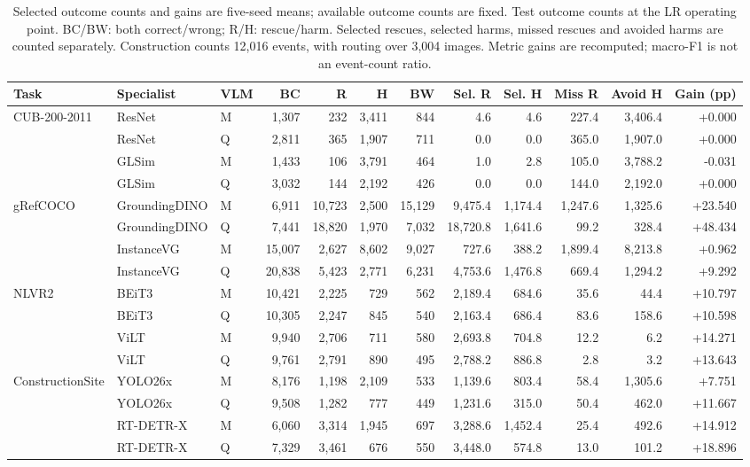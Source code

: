\begin{table}[H]
\centering
\caption{Selected outcome counts and gains are five-seed means; available outcome counts are fixed. Test outcome counts at the LR operating point. BC/BW: both correct/wrong; R/H: rescue/harm. Selected rescues, selected harms, missed rescues and avoided harms are counted separately. Construction counts 12,016 events, with routing over 3,004 images. Metric gains are recomputed; macro-F1 is not an event-count ratio.}
\label{tab:outcomes_full}
\fontsize{8.5}{10.2}\selectfont
\setlength{\tabcolsep}{3pt}
\renewcommand{\arraystretch}{1.12}
\begin{tabular}{@{}lllrrrrrrrrr@{}}
\toprule
Task & Specialist & VLM & BC & R & H & BW & Sel. R & Sel. H & Miss R & Avoid H & Gain (pp) \\
\midrule
CUB-200-2011 & ResNet & M & 1,307 & 232 & 3,411 & 844 & 4.6 & 4.6 & 227.4 & 3,406.4 & +0.000 \\
 & ResNet & Q & 2,811 & 365 & 1,907 & 711 & 0.0 & 0.0 & 365.0 & 1,907.0 & +0.000 \\
 & GLSim & M & 1,433 & 106 & 3,791 & 464 & 1.0 & 2.8 & 105.0 & 3,788.2 & -0.031 \\
 & GLSim & Q & 3,032 & 144 & 2,192 & 426 & 0.0 & 0.0 & 144.0 & 2,192.0 & +0.000 \\
\midrule
gRefCOCO & GroundingDINO & M & 6,911 & 10,723 & 2,500 & 15,129 & 9,475.4 & 1,174.4 & 1,247.6 & 1,325.6 & +23.540 \\
 & GroundingDINO & Q & 7,441 & 18,820 & 1,970 & 7,032 & 18,720.8 & 1,641.6 & 99.2 & 328.4 & +48.434 \\
 & InstanceVG & M & 15,007 & 2,627 & 8,602 & 9,027 & 727.6 & 388.2 & 1,899.4 & 8,213.8 & +0.962 \\
 & InstanceVG & Q & 20,838 & 5,423 & 2,771 & 6,231 & 4,753.6 & 1,476.8 & 669.4 & 1,294.2 & +9.292 \\
\midrule
NLVR2 & BEiT3 & M & 10,421 & 2,225 & 729 & 562 & 2,189.4 & 684.6 & 35.6 & 44.4 & +10.797 \\
 & BEiT3 & Q & 10,305 & 2,247 & 845 & 540 & 2,163.4 & 686.4 & 83.6 & 158.6 & +10.598 \\
 & ViLT & M & 9,940 & 2,706 & 711 & 580 & 2,693.8 & 704.8 & 12.2 & 6.2 & +14.271 \\
 & ViLT & Q & 9,761 & 2,791 & 890 & 495 & 2,788.2 & 886.8 & 2.8 & 3.2 & +13.643 \\
\midrule
ConstructionSite & YOLO26x & M & 8,176 & 1,198 & 2,109 & 533 & 1,139.6 & 803.4 & 58.4 & 1,305.6 & +7.751 \\
 & YOLO26x & Q & 9,508 & 1,282 & 777 & 449 & 1,231.6 & 315.0 & 50.4 & 462.0 & +11.667 \\
 & RT-DETR-X & M & 6,060 & 3,314 & 1,945 & 697 & 3,288.6 & 1,452.4 & 25.4 & 492.6 & +14.912 \\
 & RT-DETR-X & Q & 7,329 & 3,461 & 676 & 550 & 3,448.0 & 574.8 & 13.0 & 101.2 & +18.896 \\
\bottomrule
\end{tabular}
\end{table}

